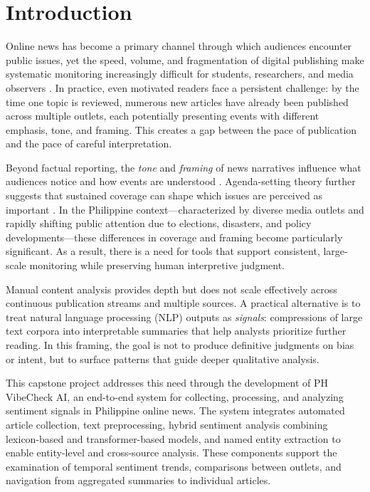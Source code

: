 \documentclass[sigconf, nonacm]{acmart}
\begin{document}

\maketitle

\section{Introduction}
Online news has become a primary channel through which audiences encounter public issues, yet the speed, volume, and fragmentation of digital publishing make systematic monitoring increasingly difficult for students, researchers, and media observers \cite{datareportal}. In practice, even motivated readers face a persistent challenge: by the time one topic is reviewed, numerous new articles have already been published across multiple outlets, each potentially presenting events with different emphasis, tone, and framing. This creates a gap between the pace of publication and the pace of careful interpretation.

Beyond factual reporting, the \emph{tone} and \emph{framing} of news narratives influence what audiences notice and how events are understood \cite{entman1993framing}. Agenda-setting theory further suggests that sustained coverage can shape which issues are perceived as important \cite{mccombs1972agenda}. In the Philippine context—characterized by diverse media outlets and rapidly shifting public attention due to elections, disasters, and policy developments—these differences in coverage and framing become particularly significant. As a result, there is a need for tools that support consistent, large-scale monitoring while preserving human interpretive judgment.

Manual content analysis provides depth but does not scale effectively across continuous publication streams and multiple sources. A practical alternative is to treat natural language processing (NLP) outputs as \emph{signals}: compressions of large text corpora into interpretable summaries that help analysts prioritize further reading. In this framing, the goal is not to produce definitive judgments on bias or intent, but to surface patterns that guide deeper qualitative analysis.

This capstone project addresses this need through the development of PH VibeCheck AI, an end-to-end system for collecting, processing, and analyzing sentiment signals in Philippine online news. The system integrates automated article collection, text preprocessing, hybrid sentiment analysis combining lexicon-based and transformer-based models, and named entity extraction to enable entity-level and cross-source analysis. These components support the examination of temporal sentiment trends, comparisons between outlets, and navigation from aggregated summaries to individual articles.
\end{document}
